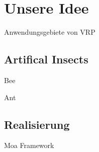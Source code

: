 \section{Unsere Idee}
\begin{frame}{Anwendungsgebiete von VRP}

\end{frame}
\subsection{Artifical Insects}
\begin{frame}{Bee}

\end{frame}
\begin{frame}{Ant}

\end{frame}
\subsection{Realisierung}
\begin{frame}{Moa Framework}

\end{frame}